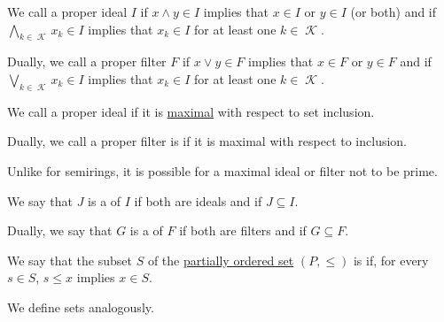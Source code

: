\begin{definition}
\begin{thmenum}
    \begin{minipage}[t]{0.45\textwidth}
      We call a proper ideal \( I \)  if \( {x \wedge y \in I} \) implies that \( x \in I \) or \( y \in I \) (or both) and  if \( \bigwedge_{k \in \mscrK} x_k \in I \) implies that \( x_k \in I \) for at least one \( k \in \mscrK \).
    \end{minipage}
    \hspace{0.02\textwidth}
    \begin{minipage}[t]{0.45\textwidth}
      Dually, we call a proper filter \( F \)  if \( x \vee y \in F \) implies that \( x \in F \) or \( y \in F \) and  if \( \bigvee_{k \in \mscrK} x_k \in I \) implies that \( x_k \in I \) for at least one \( k \in \mscrK \).
    \end{minipage}

    \begin{minipage}[t]{0.45\textwidth}
      We call a proper ideal  if it is \hyperref[def:partially_ordered_set_extremal_points/maximal_and_minimal_element]{maximal} with respect to set inclusion.
    \end{minipage}
    \hspace{0.02\textwidth}
    \begin{minipage}[t]{0.45\textwidth}
      Dually, we call a proper filter is  if it is maximal with respect to inclusion.

      Unlike for semirings, it is possible for a maximal ideal or filter not to be prime.
    \end{minipage}

    \begin{minipage}[t]{0.45\textwidth}
      We say that \( J \) is a  of \( I \) if both are ideals and if \( J \subseteq I \).
    \end{minipage}
    \hspace{0.02\textwidth}
    \begin{minipage}[t]{0.45\textwidth}
      Dually, we say that \( G \) is a  of \( F \) if both are filters and if \( G \subseteq F \).
    \end{minipage}
  \end{thmenum}
\end{definition}

\begin{definition}\label{def:closed_ordered_set}
  We say that the subset \( S \) of the \hyperref[def:partially_ordered_set]{partially ordered set} \( (P, \leq) \) is  if, for every \( s \in S \), \( s \leq x \) implies \( x \in S \).

  We define  sets analogously.
\end{definition}


